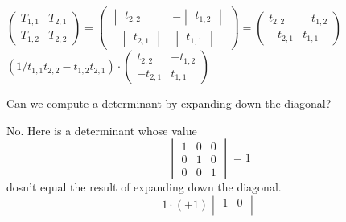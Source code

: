 \begin{exercises}
\begin{answer}
\begin{exparts}
        \partsitem
          $\begin{pmatrix}
             T_{1,1}  &T_{2,1}  \\
             T_{1,2}  &T_{2,2}
            \end{pmatrix}
            =\begin{pmatrix}
            \begin{vmatrix}
              t_{2,2}
            \end{vmatrix}
           &-\begin{vmatrix}
               t_{1,2}
             \end{vmatrix}       \\
           -\begin{vmatrix}
               t_{2,1}
            \end{vmatrix}
           &\begin{vmatrix}
              t_{1,1} 
            \end{vmatrix}
          \end{pmatrix}
          =\begin{pmatrix}
             t_{2,2}  &-t_{1,2}  \\
            -t_{2,1} &t_{1,1}
           \end{pmatrix}$
        \partsitem
          $(1/t_{1,1}t_{2,2}-t_{1,2}t_{2,1})\cdot
          \begin{pmatrix}
             t_{2,2}  &-t_{1,2}  \\
            -t_{2,1} &t_{1,1}
           \end{pmatrix}$
      \end{exparts}
    \end{answer}
  \recommended \item
    Can we compute a determinant by expanding down the diagonal?
    \begin{answer}
      No.
      Here is a determinant whose value
      \begin{equation*}
        \begin{vmatrix}
          1  &0  &0  \\
          0  &1  &0  \\
          0  &0  &1
        \end{vmatrix}=1
      \end{equation*}
      dosn't equal the result of
      expanding down the diagonal.
      \begin{equation*}
        1\cdot (+1)\begin{vmatrix}
               1  &0  \\

\end{vmatrix}
\end{equation*}
\end{answer}
\end{exercises}
